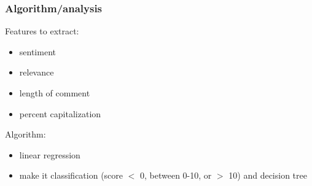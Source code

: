 \documentclass{beamer}
\begin{document}
\begin{frame}
\frametitle{Algorithm/analysis}

Features to extract:

\begin{itemize}
\item sentiment
\pause
\item relevance
\pause
\item length of comment
\pause
\item percent capitalization
\end{itemize}

\pause

Algorithm: 
\begin{itemize}
\item linear regression
\pause
\item make it classification (score $<$ 0, between 0-10, or $>$ 10) and decision tree
\end{itemize}

\end{frame}
\end{document}
